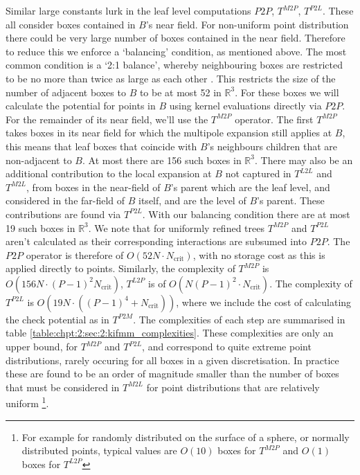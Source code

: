 Similar large constants lurk in the leaf level computations $P2P$, $T^{M2P}$, $T^{P2L}$. These all consider boxes contained in $B$'s near field. For non-uniform point distribution there could be very large number of boxes contained in the near field. Therefore to reduce this we enforce a `balancing' condition, as mentioned above. The most common condition is a `2:1 balance', whereby neighbouring boxes are restricted to be no more than twice as large as each other \cite{malhotra2015pvfmm}. This restricts the size of the number of adjacent boxes to $B$ to be at most 52 in $\mathbb{R}^3$. For these boxes we will calculate the potential for points in $B$ using kernel evaluations directly via $P2P$. For the remainder of its near field, we'll use the $T^{M2P}$ operator. The first $T^{M2P}$ takes boxes in its near field for which the multipole expansion still applies at $B$, this means that leaf boxes that coincide with $B$'s neighbours children that are non-adjacent to $B$. At most there are 156 such boxes in $\mathbb{R}^3$. There may also be an additional contribution to the local expansion at $B$ not captured in $T^{L2L}$ and $T^{M2L}$, from boxes in the near-field of $B$'s parent which are the leaf level, and considered in the far-field of $B$ itself, and are the level of $B$'s parent. These contributions are found via $T^{P2L}$. With our balancing condition there are at most 19 such boxes in $\mathbb{R}^3$. We note that for uniformly refined trees $T^{M2P}$ and $T^{P2L}$ aren't calculated as their corresponding interactions are subsumed into $P2P$. The $P2P$ operator is therefore of $O(52 N \cdot N_{\text{crit}})$, with no storage cost as this is applied directly to points. Similarly, the complexity of $T^{M2P}$ is $O(156 N \cdot (P-1)^2 N_\text{crit})$, $T^{L2P}$ is of $O(N (P-1)^2 \cdot N_\text{crit})$. The complexity of $T^{P2L}$ is $O(19 N \cdot ((P-1)^4 + N_\text{crit}))$, where we include the cost of calculating the check potential as in $T^{P2M}$. The complexities of each step are summarised in table \ref{table:chpt:2:sec:2:kifmm_complexities}. These complexities are only an upper bound, for $T^{M2P}$ and $T^{P2L}$, and correspond to quite extreme point distributions, rarely occuring for all boxes in a given discretisation. In practice these are found to be an order of magnitude smaller than the number of boxes that must be considered in $T^{M2L}$ for point distributions that are relatively uniform \footnote{For example for randomly distributed on the surface of a sphere, or normally distributed points, typical values are $O(10)$ boxes for $T^{M2P}$ and $O(1)$ boxes for $T^{L2P}$}.

